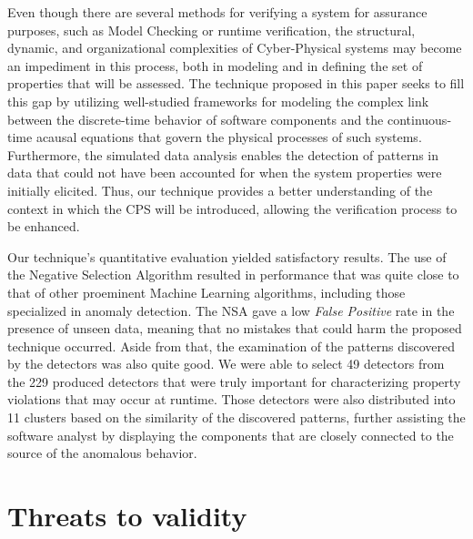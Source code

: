 Even though there are several methods for verifying a system for assurance purposes, such as Model Checking or runtime verification, the structural, dynamic, and organizational complexities of Cyber-Physical systems may become an impediment in this process, both in modeling and in defining the set of properties that will be assessed. The technique proposed in this paper seeks to fill this gap by utilizing well-studied frameworks for modeling the complex link between the discrete-time behavior of software components and the continuous-time acausal equations that govern the physical processes of such systems. Furthermore, the simulated data analysis enables the detection of patterns in data that could not have been accounted for when the system properties were initially elicited. Thus, our technique provides a better understanding of the context in which the CPS will be introduced, allowing the verification process to be enhanced.

Our technique's quantitative evaluation yielded satisfactory results. The use of the Negative Selection Algorithm resulted in performance that was quite close to that of other proeminent Machine Learning algorithms, including those specialized in anomaly detection. The NSA gave a low \textit{False Positive} rate in the presence of unseen data, meaning that no mistakes that could harm the proposed technique occurred. Aside from that, the examination of the patterns discovered by the detectors was also quite good. We were able to select 49 detectors from the 229 produced detectors that were truly important for characterizing property violations that may occur at runtime. Those detectors were also distributed into 11 clusters based on the similarity of the discovered patterns, further assisting the software analyst by displaying the components that are closely connected to the source of the anomalous behavior.

\section{Threats to validity}

